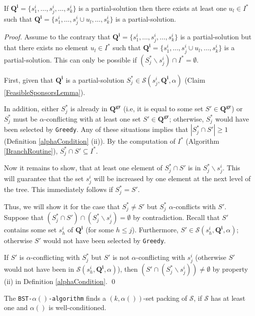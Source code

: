 \begin{lemma}\label{BranchingLemma}
If $\mathbf{Q^i}=\{s^i_1,\dots,s^i_j,\dots,s^i_k\}$ is a partial-solution then there exists at least one $u_l \in I^*$ such that $\mathbf{Q^i}=\{s^i_1,\dots, s^i_j \cup u_l, \dots,s^i_k\}$ is a partial-solution.
\end{lemma}

\begin{proof}
Assume to the contrary that $\mathbf{Q^i}=\{s^i_1,\dots,s^i_j,\dots,s^i_k\}$ is a partial-solution but that there exists no element $u_l \in I^*$ such that $\mathbf{Q^i}=\{s^i_1,\dots, s^i_j \cup u_l, \dots,s^i_k\}$ is a partial-solution. 
This can only be possible if $(S^*_j \backslash s^i_j)  \cap I^* = \emptyset$.

First, given that $\mathbf{Q^i}$ is a partial-solution $S^*_j \in \mathcal{S}(s^i_j,\mathbf{Q^i},\alpha)$ (Claim \ref{FeasibleSponsorsLemma}).

In addition, either $S^*_j$ is already in $\mathbf{Q^{gr}}$ (i.e, it is equal to some set $S' \in \mathbf{Q^{gr}}$) or $S^*_j$ must be $\alpha$-conflicting with at least one set $S' \in \mathbf{Q^{gr}}$; otherwise, $S^*_j$ would have been selected by \texttt{Greedy}. 
Any of these situations implies that $|S^*_j \cap S'| \geq 1$ (Definition \ref{alphaCondition} (ii)).
By the computation of $I^*$ (Algorithm \ref{BranchRoutine}), $S^*_j \cap S' \subseteq I^*$.

Now it remains to show, that at least one element of $S^*_j \cap S'$ is in $S^*_j \backslash s^i_j$. This will guarantee that the set $s^i_j$ will be increased by one element at the next level of the tree. This immediately follows if $S^*_j = S'$.

Thus, we will show it for the case that $S^*_j \neq S'$ but $S^*_j$ $\alpha$-conflicts with $S'$.
Suppose that $(S^*_j \cap S') \cap (S^*_j \backslash s^i_j) = \emptyset$ by contradiction.
Recall that $S'$ contains some set $s^i_h$ of $\mathbf{Q^i}$ (for some $h \leq j$).
Furthermore, $S' \in \mathcal{S}(s^i_h,\mathbf{Q^i},\alpha)$; otherwise $S'$ would not have been selected by \texttt{Greedy}.

If $S'$ is $\alpha$-conflicting with $S^*_j$ but $S'$ is not $\alpha$-conflicting with $s^i_j$ (otherwise $S'$ would not have been in $\mathcal{S}(s^i_h,\mathbf{Q^i},\alpha)$), then $(S' \cap (S^*_j \backslash s^i_j)) \neq \emptyset$ by property (ii) in Definition \ref{alphaCondition}. \qed
\end{proof} 


\begin{theorem}
The \texttt{BST-$\alpha()$-algorithm} finds a $(k,\alpha())$-set packing of $\mathcal{S}$, if $\mathcal{S}$ has at least one and $\alpha()$ is well-conditioned.
\end{theorem}

